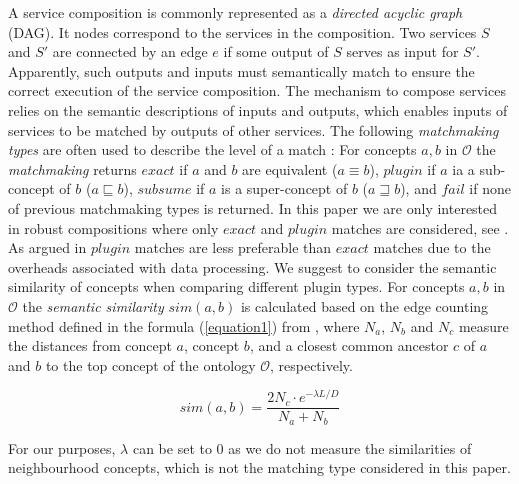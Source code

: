 \documentclass{llncs}
\begin{document}
A service composition is commonly represented as a \emph{directed acyclic graph} (DAG). It nodes correspond to the services in the composition. Two services $S$ and $S'$ are connected by an edge $e$ if some output of $S$ serves as input for $S'$. Apparently, such outputs and inputs must semantically match to ensure the correct execution of the service composition. 
The mechanism to compose services relies on the semantic descriptions of inputs and outputs, which enables inputs of services to be matched by outputs of other services. The following \emph{matchmaking types} are often used to describe the level of a match \cite{paolucci2002semantic}: For concepts $a, b$ in $\mathcal{O}$ the \emph{matchmaking} returns $exact$ if $a$ and $b$ are equivalent ($a \equiv b$), $plugin$ if $a$ ia a sub-concept of $b$ ($a \sqsubseteq b$), $subsume$ if $a$ is a super-concept of $b$ ($a \sqsupseteq b$), and $fail$ if none of previous matchmaking types is returned.
In this paper we are only interested in robust compositions where only $exact$ and $plugin$ matches are considered, see \cite{lecue2009optimizing}. 
%
As argued in \cite{lecue2009optimizing} $plugin$ matches are less preferable than $exact$ matches due to the overheads associated with data processing. We suggest to consider the semantic similarity of concepts when comparing different plugin types. For concepts $a, b$ in $\mathcal{O}$ the \emph{semantic similarity} $sim(a, b)$ is calculated based on the edge counting method defined in the formula (\ref{equation1}) from \cite{shet2012new}, where $N_a$, $N_b$ and $N_c$ measure the distances from concept $a$, concept $b$, and a closest common ancestor $c$ of $a$ and $b$ to the top concept of the ontology $\mathcal{O}$, respectively. 

\begin{equation}
sim(a, b){=} \frac{2N_c \cdot e^{-\lambda L/D} }{N_{a}+N_{b}}
\label{equation1}
\end{equation}

\noindent For our purposes, $\lambda$ can be set to 0 as we do not measure the similarities of neighbourhood concepts, which is not the matching type considered in this paper. 

\end{document}
